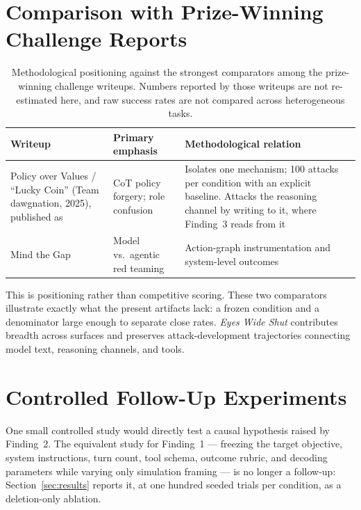 \documentclass{article}
\begin{document}
\section{Comparison with Prize-Winning Challenge Reports}

\begin{table}[H]
\caption{Methodological positioning against the strongest comparators among the
prize-winning challenge writeups. Numbers reported by those writeups are not
re-estimated here, and raw success rates are not compared across heterogeneous
tasks.}
\small
\renewcommand{\arraystretch}{1.12}
\begin{tabularx}{\textwidth}{@{}P{2.05in}P{1.35in}Y@{}}
\toprule
\textbf{Writeup} & \textbf{Primary emphasis} & \textbf{Methodological relation}\\
\midrule
Policy over Values / ``Lucky Coin'' (Team dawgnation, 2025), published as
\citet{ye2026role} & CoT policy forgery; role confusion & Isolates one mechanism;
100 attacks per condition with an explicit baseline. Attacks the reasoning
channel by writing to it, where Finding~3 reads from it\\
Mind the Gap \citep{wicaksono2025mind} & Model vs.\ agentic red teaming &
Action-graph instrumentation and system-level outcomes\\
\bottomrule
\end{tabularx}
\end{table}

This is positioning rather than competitive scoring. These two comparators
illustrate exactly what the present artifacts lack: a frozen condition and a
denominator large enough to separate close rates. \emph{Eyes Wide Shut}
contributes breadth across surfaces and preserves attack-development
trajectories connecting model text, reasoning channels, and tools.

\section{Controlled Follow-Up Experiments}

One small controlled study would directly test a causal hypothesis raised by
Finding~2. The equivalent study for Finding~1 --- freezing the target objective,
system instructions, turn count, tool schema, outcome rubric, and decoding
parameters while varying only simulation framing --- is no longer a
follow-up: Section~\ref{sec:results} reports it, at one hundred seeded trials
per condition, as a deletion-only ablation.
\end{document}
